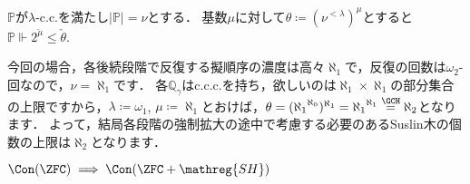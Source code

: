 \documentclass[a4j]{ltjsarticle}
\renewcommand{\defeq}{\mathrel{\coloneq}}
\newcommand{\SH}{\mathreg{SH}}
\begin{document}
\begin{lemma}
 $\mathbb{P}$が$\lambda$-c.c.を満たし$|\mathbb{P}| = \nu$とする．
 基数$\mu$に対して$\theta \defeq (\nu^{<\lambda})^\mu$とすると$\mathbb{P} \Vdash 2^{\check{\mu}} \leq \check{\theta}$.
\end{lemma}

今回の場合，各後続段階で反復する擬順序の濃度は高々$\aleph_1$で，反復の回数は$\omega_2$-回なので，$\nu = \aleph_1$です．
各$\mathbb{Q}_\gamma$はc.c.c.を持ち，欲しいのは$\aleph_1 \times \aleph_1$の部分集合の上限ですから，$\lambda \defeq \omega_1$, $\mu \defeq \aleph_1$とおけば，$\theta = ({\aleph_1}^{\aleph_0})^{\aleph_1} = {\aleph_1}^{\aleph_1} \overset{\GCH}{=} \aleph_2$となります．
よって，結局各段階の強制拡大の途中で考慮する必要のあるSuslin木の個数の上限は$\aleph_2$となります．

\begin{theorem}
 $\Con(\ZFC) \implies \Con(\ZFC+\SH)$
\end{theorem}
\end{document}
